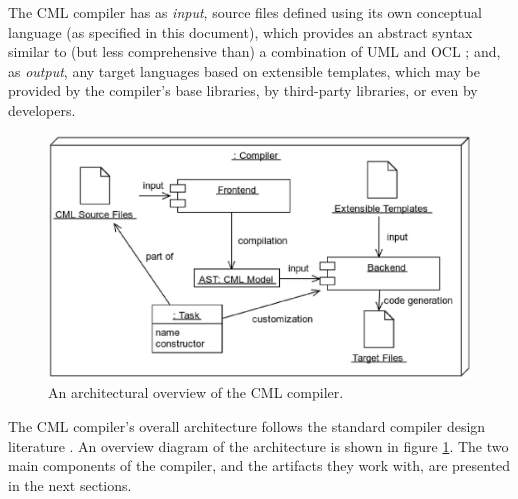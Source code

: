 The CML compiler has as \emph{input},
source files defined using its own conceptual language (as specified in this document),
which provides an abstract syntax similar to (but less comprehensive than) a combination of UML \cite{uml} and OCL \cite{ocl};
and, as \emph{output}, any target languages based on extensible templates,
which may be provided by the compiler's base libraries, by third-party libraries, or even by developers.

\begin{figure}
\centering
\includegraphics[width=\textwidth]{compiler/figure-overview}
\caption{An architectural overview of the CML compiler.}
\label{fig:overview}
\end{figure}

The CML compiler's overall architecture follows the standard compiler design literature \cite{torben}. An overview diagram of the architecture is shown in figure \ref{fig:overview}.
The two main components of the compiler,
and the artifacts they work with,
are presented in the next sections.
